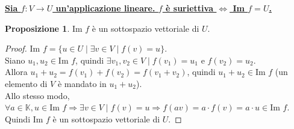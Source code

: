 \documentclass[a4paper]{article}
\theoremstyle{definition}
\newtheorem*{prop}{Proposizione}
\begin{document}
\underline{\textbf{Sia $f: V \rightarrow U$ un'applicazione lineare. $f$ è suriettiva $\Leftrightarrow$ Im $f = U$.}}

\begin{prop}
	Im $f$ è un sottospazio vettoriale di $U$.
\end{prop}
\begin{proof}
	Im $f = \{u \in U \mid \exists v \in V \mid f(v) = u\}$. \\
	Siano $u_1, u_2 \in \text{Im } f$, quindi $\exists v_1, v_2 \in V \mid f(v_1) = u_1$ e $f(v_2) = u_2$. \\
	Allora $u_1 + u_2 = f(v_1) + f(v_2) = f(v_1 + v_2)$, quindi $u_1 + u_2 \in \text{Im } f$ (un elemento di $V$ è mandato in $u_1 + u_2$). \\
	Allo stesso modo, $\forall a \in \mathbb{K}, u \in \text{Im } f \Rightarrow \exists v \in V \mid f(v) = u \Rightarrow f(av) = a \cdot f(v) = a \cdot u \in \text{Im } f$. \\
	Quindi Im $f$ è un sottospazio vettoriale di $U$.
\end{proof}
\end{document}
